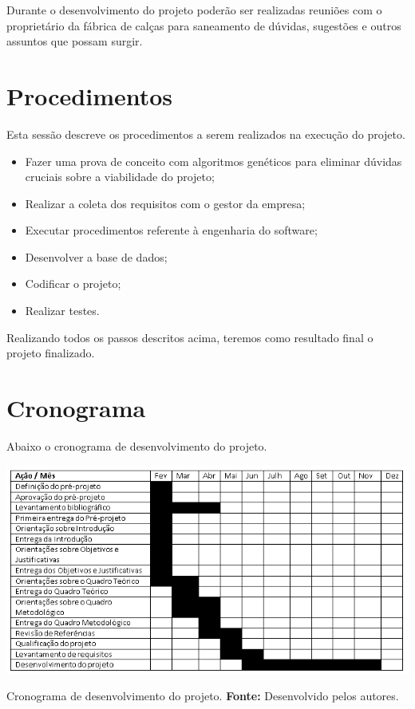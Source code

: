 \par Durante o desenvolvimento do projeto poderão ser realizadas reuniões
com o proprietário da fábrica de calças para saneamento de dúvidas, sugestões e
outros assuntos que possam surgir.

\section{Procedimentos}

\par Esta sessão descreve os procedimentos a serem realizados na execução do
projeto.

 \begin{itemize}

	\item Fazer uma prova de conceito com algoritmos genéticos para eliminar
	dúvidas cruciais sobre a viabilidade do projeto;
	  
	\item Realizar a coleta dos requisitos com o gestor da empresa;
	
	\item Executar procedimentos referente à engenharia do software;
	
	\item Desenvolver a base de dados;
	
	\item Codificar o projeto;

	\item Realizar testes.
	 
 \end{itemize}
 
 \par Realizando todos os passos descritos acima, teremos como resultado final o
 projeto finalizado.

\newpage

\section{Cronograma}

\par Abaixo o cronograma de desenvolvimento do projeto.

\begin{table}[ht!]
\centering
\includegraphics[width=150mm]{./imagens/tabela.jpg}
\caption{Cronograma de desenvolvimento do projeto. \textbf{Fonte:} Desenvolvido
pelos autores.}
\end{table}
\newpage

